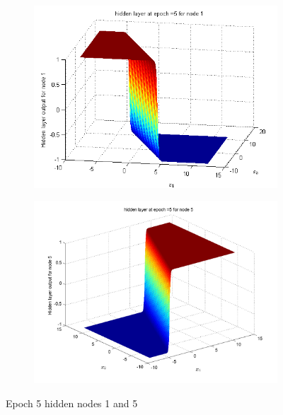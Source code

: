 \documentclass{article}
\begin{document}
\begin{figure}
\begin{subfigure}{.5\textwidth}
  \centering
  \includegraphics[width=.8\linewidth]{Classification/overlapping/h5_1}
 
\end{subfigure}%
\begin{subfigure}{.5\textwidth}
  \centering
  \includegraphics[width=.8\linewidth]{Classification/overlapping/h5_5}
  \end{subfigure}
\caption{Epoch 5 hidden nodes 1 and 5}
\end{figure}
\end{document}
